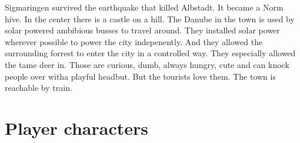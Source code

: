 Sigmaringen survived the earthquake that killed Albstadt. It became a Norm hive. In the center there is a castle on a hill. The Danube in the town is used by solar powered ambibious busses to travel around. They installed solar power wherever possible to power the city indepenently. And they allowed the surrounding forrest to enter the city in a controlled way. They especially allowed the tame deer in. Those are curious, dumb, always hungry, cute and can knock people over witha  playful headbut. But the tourists love them.
The town is reachable by train.



\section{Player characters}

